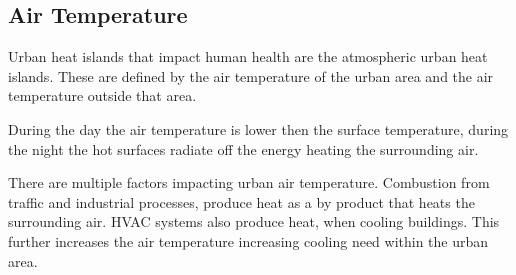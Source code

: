 \subsection{Air Temperature}
Urban heat islands that impact human health are the atmospheric urban heat islands. 
These are defined by the air temperature of the urban area and the air temperature outside that area. %

During the day the air temperature is lower then the surface temperature\cite{EPA2008}, during the night the hot surfaces radiate off the energy heating the surrounding air. 

There are multiple factors impacting urban air temperature. 
Combustion from traffic and industrial processes, produce heat as a by product that heats the surrounding air. 
HVAC systems also produce heat, when cooling buildings. This further increases the air temperature increasing cooling need within the urban area. 

